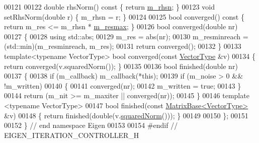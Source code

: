 \begin{DoxyCode}
00121 
00122     \textcolor{keywordtype}{double} rhsNorm()\textcolor{keyword}{ const }\{ \textcolor{keywordflow}{return} \hyperlink{class_eigen_1_1_iteration_controller_a43364d62c43861aff44cb0a86c4615a6}{m\_rhsn}; \}
00123     \textcolor{keywordtype}{void} setRhsNorm(\textcolor{keywordtype}{double} r) \{ m\_rhsn = r; \}
00124 
00125     \textcolor{keywordtype}{bool} converged()\textcolor{keyword}{ const }\{ \textcolor{keywordflow}{return} m\_res <= m\_rhsn * \hyperlink{class_eigen_1_1_iteration_controller_a5342235a082ee820516fd593ee1efeac}{m\_resmax}; \}
00126     \textcolor{keywordtype}{bool} converged(\textcolor{keywordtype}{double} nr)
00127     \{
00128       \textcolor{keyword}{using} std::abs;
00129       m\_res = abs(nr); 
00130       m\_resminreach = (std::min)(m\_resminreach, m\_res);
00131       \textcolor{keywordflow}{return} converged();
00132     \}
00133     \textcolor{keyword}{template}<\textcolor{keyword}{typename} VectorType> \textcolor{keywordtype}{bool} converged(\textcolor{keyword}{const} \hyperlink{struct_vector_type}{VectorType} &v)
00134     \{ \textcolor{keywordflow}{return} converged(v.squaredNorm()); \}
00135 
00136     \textcolor{keywordtype}{bool} finished(\textcolor{keywordtype}{double} nr)
00137     \{
00138       \textcolor{keywordflow}{if} (m\_callback) m\_callback(*\textcolor{keyword}{this});
00139       \textcolor{keywordflow}{if} (m\_noise > 0 && !m\_written)
00140       \{
00141         converged(nr);
00142         m\_written = \textcolor{keyword}{true};
00143       \}
00144       \textcolor{keywordflow}{return} (m\_nit >= m\_maxiter || converged(nr));
00145     \}
00146     \textcolor{keyword}{template} <\textcolor{keyword}{typename} VectorType>
00147     \textcolor{keywordtype}{bool} finished(\textcolor{keyword}{const} \hyperlink{group___core___module_class_eigen_1_1_matrix_base}{MatrixBase<VectorType>} &v)
00148     \{ \textcolor{keywordflow}{return} finished(\textcolor{keywordtype}{double}(v.\hyperlink{group___core___module_a8782faeb21e43908cdce47cec06fba23}{squaredNorm}())); \}
00149 
00150 \};
00151 
00152 \} \textcolor{comment}{// end namespace Eigen}
00153 
00154 \textcolor{preprocessor}{#endif // EIGEN\_ITERATION\_CONTROLLER\_H}
\end{DoxyCode}
